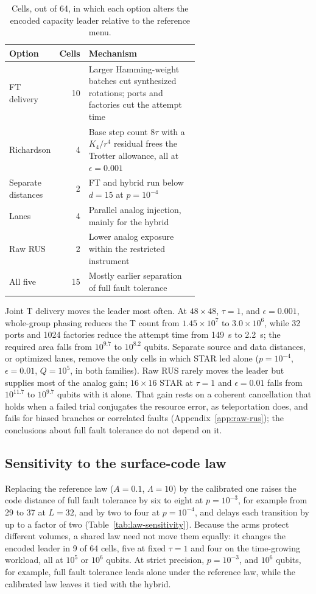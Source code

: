 \documentclass[11pt]{article}
\newcommand{\eps}{\epsilon}
\begin{document}
\begin{table}[!htbp]
\centering
\small
\begin{tabular}{@{}lrp{0.62\linewidth}@{}}
\toprule
Option & Cells & Mechanism\\
\midrule
FT delivery & 10 & Larger Hamming-weight batches cut synthesized rotations; ports and factories cut the attempt time\\
Richardson & 4 & Base step count $8\tau$ with a $K_4/r^4$ residual frees the Trotter allowance, all at $\eps=0.001$\\
Separate distances & 2 & FT and hybrid run below $d=15$ at $p=10^{-4}$\\
Lanes & 4 & Parallel analog injection, mainly for the hybrid\\
Raw RUS & 2 & Lower analog exposure within the restricted instrument\\
All five & 15 & Mostly earlier separation of full fault tolerance\\
\bottomrule
\end{tabular}
\caption{Cells, out of 64, in which each option alters the encoded capacity
leader relative to the reference menu.}\label{tab:leader-changes}
\end{table}

Joint T delivery moves the leader most often. At $48\times48$, $\tau=1$, and
$\eps=0.001$, whole-group phasing reduces the T count from $1.45\times10^7$ to
$3.0\times10^6$, while 32 ports and 1024 factories reduce the attempt time from
149~s to 2.2~s; the required area falls from $10^{9.7}$ to $10^{8.2}$ qubits.
Separate source and data distances, or optimized lanes, remove the only cells in
which STAR led alone ($p=10^{-4}$, $\eps=0.01$, $Q=10^5$, in both families). Raw
RUS rarely moves the leader but supplies most of the analog gain; $16\times16$
STAR at $\tau=1$ and $\eps=0.01$ falls from $10^{11.7}$ to $10^{9.7}$ qubits with it
alone. That gain rests on a coherent
cancellation that holds when a failed trial conjugates the resource error, as
teleportation does, and fails for biased branches or correlated faults
(Appendix~\ref{app:raw-rus}); the conclusions about full fault tolerance do not
depend on it.

\subsection{Sensitivity to the surface-code law}\label{sec:law-sensitivity}
Replacing the reference law ($A=0.1$, $\Lambda=10$) by the calibrated one
raises the code distance of full fault tolerance by six to eight at $p=10^{-3}$,
for example from 29 to 37 at $L=32$, and by two to four at $p=10^{-4}$, and delays
each transition by up to a factor of two (Table~\ref{tab:law-sensitivity}).
Because the arms protect different volumes, a shared law need not move them
equally: it changes the encoded leader in 9 of 64 cells, five at fixed $\tau=1$
and four on the time-growing workload, all at $10^5$ or $10^6$ qubits. At strict
precision, $p=10^{-3}$, and $10^6$ qubits, for example, full fault tolerance
leads alone under the reference law, while the calibrated law leaves it tied
with the hybrid.
\end{document}
